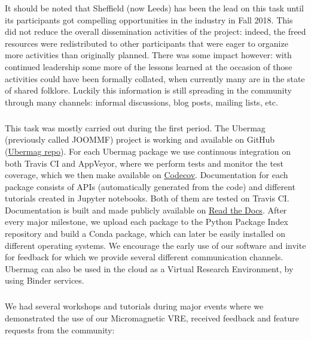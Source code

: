 It should be noted that Sheffield (now Leeds) has been the lead on
this task until its participants got compelling opportunities in the
industry in Fall 2018. This did not reduce the overall dissemination
activities of the project: indeed, the freed resources were
redistributed to other participants that were eager to organize more
activities than originally planned. There was some impact however:
with continued leadership some more of the lessons learned at the
occasion of those activities could have been formally collated, when
currently many are in the state of shared folklore. Luckily this
information is still spreading in the community through many channels:
informal discussions, blog posts, mailing lists, etc.


\subparagraph{}
\label{dissem@dissemination-of-oommf-nb-virtual-environment}


This task was mostly carried out during the first period. The Ubermag
(previously called JOOMMF) project is working and available on GitHub
(\href{https://github.com/ubermag}{Ubermag repo}). For each Ubermag
package we use continuous integration on both Travis CI and AppVeyor,
where we perform tests and monitor the test coverage, which we then
make available on \href{https://codecov.io/}{Codecov}. Documentation
for each package consists of APIs (automatically generated from the
code) and different tutorials created in Jupyter notebooks. Both of
them are tested on Travis CI. Documentation is built and made publicly
available on \href{http://discretisedfield.readthedocs.io}{Read the
  Docs}. After every major milestone, we upload each package to the
Python Package Index repository and build a Conda package, which can
later be easily installed on different operating systems. We encourage
the early use of our software and invite for feedback for which we
provide several different communication channels. Ubermag can also be
used in the cloud as a Virtual Research Environment, by using Binder
services.

\subparagraph{}
\label{dissem@dissemination-of-oommf-nb-workshops}

We had several workshops and tutorials during major events where we demonstrated the use of our Micromagnetic VRE, received feedback and feature requests from the community:

